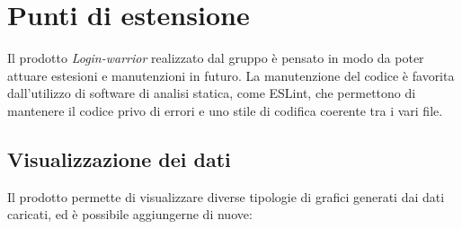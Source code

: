 \section{Punti di estensione}

Il prodotto \textit{Login-warrior} realizzato dal gruppo è pensato in modo da poter attuare estesioni e manutenzioni in futuro. La manutenzione del codice è favorita dall'utilizzo di software di analisi statica, come ESLint, che permettono di mantenere il codice privo di errori e uno stile di codifica coerente tra i vari file.  

\subsection{Visualizzazione dei dati}
Il prodotto permette di visualizzare diverse tipologie di grafici generati dai dati caricati, ed è possibile aggiungerne di nuove:
